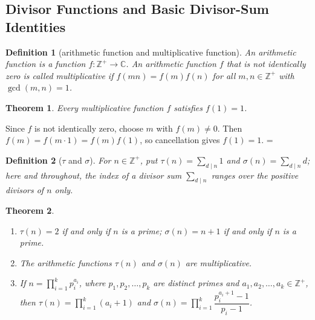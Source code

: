 \documentclass[11pt]{article}
\makeatletter
\let\nt@closedisplay\]
\def\nt@guardedclose{\@ifnextchar\par{\nt@closeafterpar}{\@ifnextchar\end{\postdisplaypenalty\@M\nt@closedisplay}{\nt@closedisplay}}}
\def\nt@closeafterpar\par{\@ifnextchar\par{\nt@closeafterpar}{\@ifnextchar\end{\postdisplaypenalty\@M\nt@closedisplay\par}{\nt@closedisplay\par}}}
\renewenvironment{proof}[1][\proofname]{\par
  \pushQED{\qed}\normalfont\topsep\medskipamount\edef\nt@afterproof{\@endparpenalty=\the\@endparpenalty\relax}\@beginparpenalty\@M\@endparpenalty\@M\let\]\nt@guardedclose\trivlist\item[]\textit{#1\@addpunct{.}} \ignorespaces}{\ifvmode\addpenalty\@M\fi\popQED\nt@afterproof\endtrivlist\@endpefalse}
\theoremstyle{ntstyle}
\newtheorem{theorem}{Theorem}[subsection]
\newtheorem{definition}{Definition}[subsection]
\newcommand{\statementlist}{\mbox{}}
\makeatother
\begin{document}
\subsection{Divisor Functions and Basic Divisor-Sum Identities}

\begin{definition}[arithmetic function and multiplicative function]\label{def:5.1.1}\label{def:arithmetic-function-and-multiplicative-function}
  An
  arithmetic function is a function $f:\mathbb{Z}^+\to\mathbb{C}$. An arithmetic
  function $f$ that is not identically zero is called multiplicative
  if $f(mn)=f(m)f(n)$ for all $m,n\in\mathbb{Z}^+$
  with $\gcd(m, n)=1$.

\end{definition}

\begin{theorem}\label{thm:5.1.1}
  Every multiplicative function $f$ satisfies $f(1)=1$.

\end{theorem}

\begin{proof} Since $f$ is not identically zero, choose $m$ with
  $f(m)\neq0$. Then $f(m)=f(m\cdot1)=f(m)f(1)$, so cancellation gives
  $f(1)=1$.
\end{proof}

\begin{definition}[$\tau$ and $\sigma$]\label{def:5.1.2}\label{def:tau-and-sigma}
  For $n \in \mathbb{Z}^+$, put $\tau(n) = \sum_{d \mid n} 1$ and $\sigma(n) = \sum_{d \mid n} d$; here and
  throughout, the index of a divisor sum $\sum_{d \mid n}$ ranges over the positive divisors of $n$ only.

\end{definition}

\begin{theorem}\label{thm:5.1.2}\statementlist

  \begin{enumerate}[label={\alph*)}]
    \item $\tau(n) = 2$ if and only if $n$ is a prime; $\sigma(n) = n + 1$ if and only if $n$ is a prime.
    \item The arithmetic functions $\tau(n)$ and $\sigma(n)$ are multiplicative.
    \item If $n=\prod_{i=1}^{k}p_i^{a_i}$, where $p_1,p_2,\ldots,p_k$
          are distinct primes and $a_1,a_2,\ldots,a_k\in\mathbb{Z}^+$, then
          $\tau(n)=\prod_{i=1}^{k}(a_i+1)$ and
          $\sigma(n)=\prod_{i=1}^{k}\dfrac{p_i^{a_i+1}-1}{p_i-1}$.
  \end{enumerate}

\end{theorem}
\end{document}
